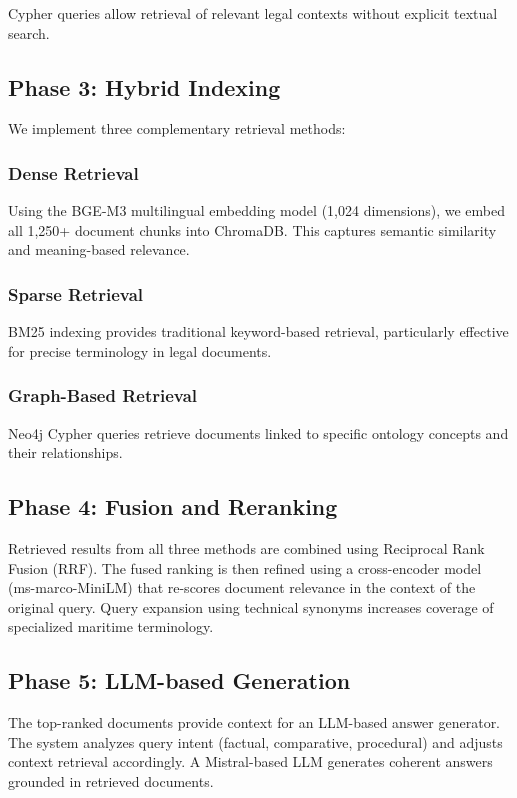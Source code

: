 \documentclass[11pt,a4paper]{article}
\begin{document}
Cypher queries allow retrieval of relevant legal contexts without explicit textual search.

\subsection{Phase 3: Hybrid Indexing}

We implement three complementary retrieval methods:

\subsubsection{Dense Retrieval}
Using the BGE-M3 multilingual embedding model (1,024 dimensions), we embed all 1,250+ document chunks into ChromaDB. This captures semantic similarity and meaning-based relevance.

\subsubsection{Sparse Retrieval}
BM25 indexing provides traditional keyword-based retrieval, particularly effective for precise terminology in legal documents.

\subsubsection{Graph-Based Retrieval}
Neo4j Cypher queries retrieve documents linked to specific ontology concepts and their relationships.

\subsection{Phase 4: Fusion and Reranking}

Retrieved results from all three methods are combined using Reciprocal Rank Fusion (RRF). The fused ranking is then refined using a cross-encoder model (ms-marco-MiniLM) that re-scores document relevance in the context of the original query. Query expansion using technical synonyms increases coverage of specialized maritime terminology.

\subsection{Phase 5: LLM-based Generation}

The top-ranked documents provide context for an LLM-based answer generator. The system analyzes query intent (factual, comparative, procedural) and adjusts context retrieval accordingly. A Mistral-based LLM generates coherent answers grounded in retrieved documents.
\end{document}
